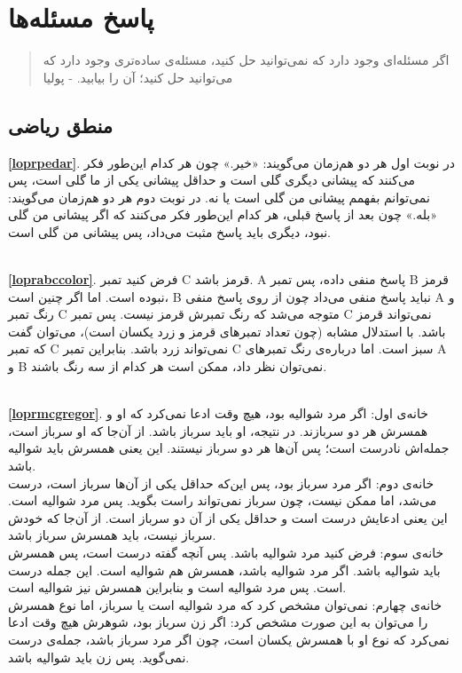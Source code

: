 \chapter{پاسخ مسئله‌ها}
\thispagestyle{empty}

\begin{quote}
	{\lotus
		اگر مسئله‌ای وجود دارد که نمی‌توانید حل کنید، مسئله‌ی ساده‌تری وجود دارد که می‌توانید حل کنید؛ آن را بیابید. \quad - پولیا%
	}
\end{quote}
\section*{منطق ریاضی}
\textbf{\ref{loprpedar}}.
در نوبت اول هر دو هم‌زمان می‌گویند: «خیر.» چون هر کدام این‌طور فکر می‌کنند که پیشانی دیگری گلی است و حداقل پیشانی یکی از ما گلی است، پس نمی‌توانم بفهمم پیشانی من گلی است یا نه. در نوبت دوم هر دو هم‌زمان می‌گویند: «بله.» چون بعد از پاسخ قبلی، هر کدام این‌طور فکر می‌کنند که اگر پیشانی من گلی نبود، دیگری باید پاسخ مثبت می‌داد، پس پیشانی من گلی است.

\df \\ \textbf{\ref{loprabccolor}}.
فرض کنید تمبر C قرمز باشد. A پاسخ منفی داده، پس تمبر B قرمز نبوده است. اما اگر چنین است، B نباید پاسخ منفی می‌داد چون از روی پاسخ منفی A و رنگ تمبر C متوجه می‌شد که رنگ تمبرش قرمز نیست. پس تمبر C نمی‌تواند قرمز باشد. با استدلال مشابه (چون تعداد تمبرهای قرمز و زرد یکسان است)، می‌توان گفت که تمبر C نمی‌تواند زرد باشد. بنابراین تمبر C سبز است. اما درباره‌ی رنگ تمبرهای A و B نمی‌توان نظر داد، ممکن است هر کدام از سه رنگ باشند.

\df \\ \textbf{\ref{loprmcgregor}}.
خانه‌ی اول: اگر مرد شوالیه بود، هیچ وقت ادعا نمی‌کرد که او و همسرش هر دو سربازند. در نتیجه، او باید سرباز باشد. از آن‌جا که او سرباز است، جمله‌اش نادرست است؛ پس آن‌ها هر دو سرباز نیستند. این یعنی همسرش باید شوالیه باشد. \\
خانه‌ی دوم: اگر مرد سرباز بود، پس این‌که حداقل یکی از آن‌ها سرباز است، درست می‌شد، اما ممکن نیست، چون سرباز نمی‌تواند راست بگوید. پس مرد شوالیه است. این یعنی ادعایش درست است و حداقل یکی از آن دو سرباز است. از آن‌جا که خودش سرباز نیست، باید همسرش سرباز باشد. \\
خانه‌ی سوم: فرض کنید مرد شوالیه باشد. پس آنچه گفته درست است، پس همسرش باید شوالیه باشد. اگر مرد شوالیه باشد، همسرش هم شوالیه است. این جمله درست است. پس مرد شوالیه است و بنابراین همسرش نیز شوالیه است. \\
خانه‌ی چهارم: نمی‌توان مشخص کرد که مرد شوالیه است یا سرباز، اما نوع همسرش را می‌توان به این صورت مشخص کرد: اگر زن سرباز بود، شوهرش هیچ وقت ادعا نمی‌کرد که نوع او با همسرش یکسان است، چون اگر مرد سرباز باشد، جمله‌ی درست نمی‌گوید. پس زن باید شوالیه باشد.

